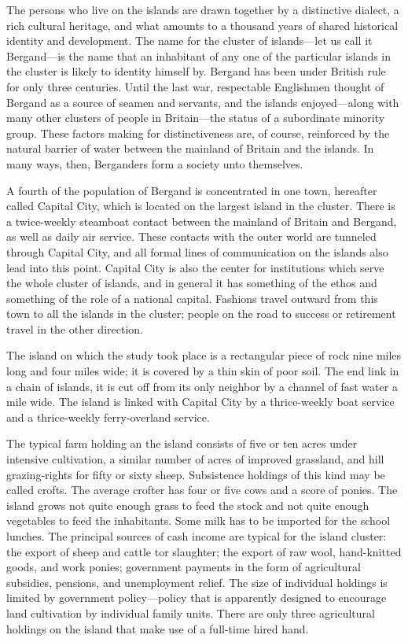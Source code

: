 \documentclass[openany,nobib]{tufte-book}
\begin{document}
The persons who live on the islands are drawn together by a distinctive
dialect, a rich cultural heritage, and what amounts to a thousand years
of shared historical identity and development. The name for the cluster
of islands---let us call it Bergand---is the name that an inhabitant of
any one of the particular islands in the cluster is likely to identity
himself by. Bergand has been under British rule for only three
centuries. Until the last war, respectable Englishmen thought of Bergand
as a source of seamen and servants, and the islands enjoyed---along with
many other clusters of people in Britain---the status of a subordinate
minority group. These factors making for distinctiveness are, of course,
reinforced by the natural barrier of water between the mainland of
Britain and the islands. In many ways, then, Berganders form a society
unto themselves.

A fourth of the population of Bergand is concentrated in one town,
hereafter called Capital City, which is located on the largest island in
the cluster. There is a twice-weekly steamboat contact between the
mainland of Britain and Bergand, as well as daily air service. These
contacts with the outer world are tunneled through Capital City, and all
formal lines of communication on the islands also lead into this point.
Capital City is also the center for institutions which serve the whole
cluster of islands, and in general it has something of the ethos and
something of the role of a national capital. Fashions travel outward
from this town to all the islands in the cluster; people on the road to
success or retirement travel in the other direction.

The island on which the study took place is a rectangular piece of rock
nine miles long and four miles wide; it is covered by a thin skin of
poor soil. The end link in a chain of islands, it is cut off from its
only neighbor by a channel of fast water a mile wide. The island is
linked with Capital City by a thrice-weekly boat service and a
thrice-weekly ferry-overland service.

The typical farm holding an the island consists of five or ten acres
under intensive cultivation, a similar number of acres of improved
grassland, and hill grazing-rights for fifty or sixty sheep. Subsistence
holdings of this kind may be called crofts. The average crofter has four
or five cows and a score of ponies. The island grows not quite enough
grass to feed the stock and not quite enough vegetables to feed the
inhabitants. Some milk has to be imported for the school lunches. The
principal sources of cash income are typical for the island cluster: the
export of sheep and cattle tor slaughter; the export of raw wool,
hand-knitted goods, and work ponies; government payments in the form of
agricultural subsidies, pensions, and unemployment relief. The size of
individual holdings is limited by government policy---policy that is
apparently designed to encourage land cultivation by individual family
units. There are only three agricultural holdings on the island that
make use of a full-time hired hand.
\end{document}
